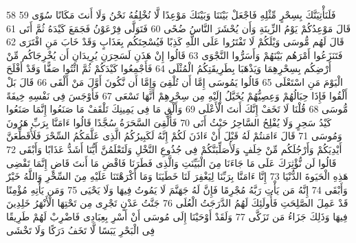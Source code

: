 \documentclass[20pt,a4paper]{article}
\begin{document}
{\tiny\colorbox{cl_aya}{58}} فَلَنَأْتِيَنَّكَ بِسِحْرٍ مِّثْلِهِ فَاجْعَلْ بَيْنَنَا وَبَيْنَكَ مَوْعِدًا لَّا نُخْلِفُهُ نَحْنُ وَلَا أَنتَ مَكَانًا سُوًى
{\tiny\colorbox{cl_aya}{59}} قَالَ مَوْعِدُكُمْ يَوْمُ الزِّينَةِ وَأَن يُحْشَرَ النَّاسُ ضُحًى
{\tiny\colorbox{cl_aya}{60}} فَتَوَلَّى فِرْعَوْنُ فَجَمَعَ كَيْدَهُ ثُمَّ أَتَى
{\tiny\colorbox{cl_aya}{61}} قَالَ لَهُم مُّوسَى وَيْلَكُمْ لَا تَفْتَرُوا عَلَى اللَّهِ كَذِبًا فَيُسْحِتَكُم بِعَذَابٍ وَقَدْ خَابَ مَنِ افْتَرَى
{\tiny\colorbox{cl_aya}{62}} فَتَنَزَعُوا أَمْرَهُم بَيْنَهُمْ وَأَسَرُّوا النَّجْوَى
{\tiny\colorbox{cl_aya}{63}} قَالُوا إِنْ هَذَنِ لَسَحِرَنِ يُرِيدَانِ أَن يُخْرِجَاكُم مِّنْ أَرْضِكُم بِسِحْرِهِمَا وَيَذْهَبَا بِطَرِيقَتِكُمُ الْمُثْلَى
{\tiny\colorbox{cl_aya}{64}} فَأَجْمِعُوا كَيْدَكُمْ ثُمَّ ائْتُوا صَفًّا وَقَدْ أَفْلَحَ الْيَوْمَ مَنِ اسْتَعْلَى
{\tiny\colorbox{cl_aya}{65}} قَالُوا يَمُوسَى إِمَّا أَن تُلْقِىَ وَإِمَّا أَن نَّكُونَ أَوَّلَ مَنْ أَلْقَى
{\tiny\colorbox{cl_aya}{66}} قَالَ بَلْ أَلْقُوا فَإِذَا حِبَالُهُمْ وَعِصِيُّهُمْ يُخَيَّلُ إِلَيْهِ مِن سِحْرِهِمْ أَنَّهَا تَسْعَى
{\tiny\colorbox{cl_aya}{67}} فَأَوْجَسَ فِى نَفْسِهِ خِيفَةً مُّوسَى
{\tiny\colorbox{cl_aya}{68}} قُلْنَا لَا تَخَفْ إِنَّكَ أَنتَ الْأَعْلَى
{\tiny\colorbox{cl_aya}{69}} وَأَلْقِ مَا فِى يَمِينِكَ تَلْقَفْ مَا صَنَعُوا إِنَّمَا صَنَعُوا كَيْدُ سَحِرٍ وَلَا يُفْلِحُ السَّاحِرُ حَيْثُ أَتَى
{\tiny\colorbox{cl_aya}{70}} فَأُلْقِىَ السَّحَرَةُ سُجَّدًا قَالُوا ءَامَنَّا بِرَبِّ هَرُونَ وَمُوسَى
{\tiny\colorbox{cl_aya}{71}} قَالَ ءَامَنتُمْ لَهُ قَبْلَ أَنْ ءَاذَنَ لَكُمْ إِنَّهُ لَكَبِيرُكُمُ الَّذِى عَلَّمَكُمُ السِّحْرَ فَلَأُقَطِّعَنَّ أَيْدِيَكُمْ وَأَرْجُلَكُم مِّنْ خِلَفٍ وَلَأُصَلِّبَنَّكُمْ فِى جُذُوعِ النَّخْلِ وَلَتَعْلَمُنَّ أَيُّنَا أَشَدُّ عَذَابًا وَأَبْقَى
{\tiny\colorbox{cl_aya}{72}} قَالُوا لَن نُّؤْثِرَكَ عَلَى مَا جَاءَنَا مِنَ الْبَيِّنَتِ وَالَّذِى فَطَرَنَا فَاقْضِ مَا أَنتَ قَاضٍ إِنَّمَا تَقْضِى هَذِهِ الْحَيَوةَ الدُّنْيَا
{\tiny\colorbox{cl_aya}{73}} إِنَّا ءَامَنَّا بِرَبِّنَا لِيَغْفِرَ لَنَا خَطَيَنَا وَمَا أَكْرَهْتَنَا عَلَيْهِ مِنَ السِّحْرِ وَاللَّهُ خَيْرٌ وَأَبْقَى
{\tiny\colorbox{cl_aya}{74}} إِنَّهُ مَن يَأْتِ رَبَّهُ مُجْرِمًا فَإِنَّ لَهُ جَهَنَّمَ لَا يَمُوتُ فِيهَا وَلَا يَحْيَى
{\tiny\colorbox{cl_aya}{75}} وَمَن يَأْتِهِ مُؤْمِنًا قَدْ عَمِلَ الصَّلِحَتِ فَأُولَئِكَ لَهُمُ الدَّرَجَتُ الْعُلَى
{\tiny\colorbox{cl_aya}{76}} جَنَّتُ عَدْنٍ تَجْرِى مِن تَحْتِهَا الْأَنْهَرُ خَلِدِينَ فِيهَا وَذَلِكَ جَزَاءُ مَن تَزَكَّى
{\tiny\colorbox{cl_aya}{77}} وَلَقَدْ أَوْحَيْنَا إِلَى مُوسَى أَنْ أَسْرِ بِعِبَادِى فَاضْرِبْ لَهُمْ طَرِيقًا فِى الْبَحْرِ يَبَسًا لَّا تَخَفُ دَرَكًا وَلَا تَخْشَى
\end{document}
